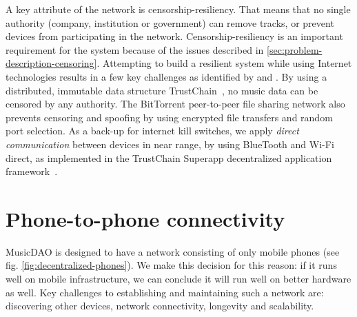 A key attribute of the network is censorship-resiliency. That means that no single authority (company, institution or government) can remove tracks, or prevent devices from participating in the network. Censorship-resiliency is an important requirement for the system because of the issues described in \ref{sec:problem-description-censoring}. Attempting to build a resilient system while using Internet technologies results in a few key challenges as identified by \cite{pouwelse2012censorship} and \cite{di2014bypassing}. By using a distributed, immutable data structure TrustChain~\citep{otte2017trustchain}, no music data can be censored by any authority. The BitTorrent peer-to-peer file sharing network also prevents censoring and spoofing by using encrypted file transfers and random port selection. As a back-up for internet kill switches, we apply \textit{direct communication} between devices in near range, by using BlueTooth and Wi-Fi direct, as implemented in the TrustChain Superapp decentralized application framework~\citep{mattskala2020}.

\section{Phone-to-phone connectivity}
MusicDAO is designed to have a network consisting of only mobile phones (see fig. \ref{fig:decentralized-phones}). We make this decision for this reason: if it runs well on mobile infrastructure, we can conclude it will run well on better hardware as well. Key challenges to establishing and maintaining such a network are: discovering other devices, network connectivity, longevity and scalability.

